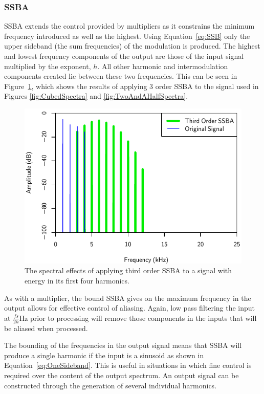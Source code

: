 		\subsubsection*{SSBA}
			SSBA extends the control provided by multipliers as it constrains the minimum frequency introduced
			as well as the highest. Using Equation~\ref{eq:SSB} only the upper sideband (the sum frequencies)
			of the modulation is produced. The highest and lowest frequency components of the output are those
			of the input signal multiplied by the exponent, $h$. All other harmonic and intermodulation
			components created lie between these two frequencies. This can be seen in
			Figure~\ref{fig:SSBA3Spectra}, which shows the results of applying $3$ order SSBA to the
			signal used in Figures \ref{fig:CubedSpectra} and \ref{fig:TwoAndAHalfSpectra}. 
			
			\begin{figure}[h!]
				\centering
				\includegraphics{chapter5/Images/SSBA3Spectra.pdf}
				\caption{The spectral effects of applying third order SSBA to a signal with energy in its 
				         first four harmonics.}
				\label{fig:SSBA3Spectra}
			\end{figure}

			As with a multiplier, the bound SSBA gives on the maximum frequency in the output allows for
			effective control of aliasing. Again, low pass filtering the input at $\frac{fs}{2h}$Hz prior to
			processing will remove those components in the inputs that will be aliased when processed.

			The bounding of the frequencies in the output signal means that SSBA will produce a single harmonic
			if the input is a sinusoid as shown in Equation~\ref{eq:OneSideband}. This is useful in situations
			in which fine control is required over the content of the output spectrum. An output signal can be
			constructed through the generation of several individual harmonics.

